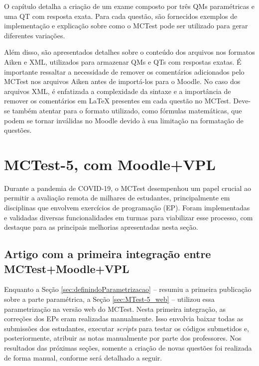 O capítulo detalha a criação de um exame composto por três QMs paramétricas e uma QT com resposta exata. Para cada questão, são fornecidos exemplos de implementação e explicação sobre como o MCTest pode ser utilizado para gerar diferentes variações.

Além disso, são apresentados detalhes sobre o conteúdo dos arquivos nos formatos Aiken e XML, utilizados para armazenar QMs e QTs com respostas exatas. É importante ressaltar a necessidade de remover os comentários adicionados pelo MCTest nos arquivos Aiken antes de importá-los para o Moodle. No caso dos arquivos XML, é enfatizada a complexidade da sintaxe e a importância de remover os comentários em \LaTeX{} presentes em cada questão no MCTest. Deve-se também atentar para o formato utilizado, como fórmulas matemáticas, que podem se tornar inválidas no Moodle devido à sua limitação na formatação de questões.

\section{MCTest-5, com Moodle+VPL}

Durante a pandemia de COVID-19, o MCTest desempenhou um papel crucial ao permitir a avaliação remota de milhares de estudantes, principalmente em disciplinas que envolvem exercícios de programação (EP). Foram implementadas e validadas diversas funcionalidades em turmas para viabilizar esse processo, com destaque para as principais melhorias apresentadas nesta seção. %

\subsection{Artigo com a primeira integração entre MCTest+Moodle+VPL}\label{sec:MCTest-5web}

Enquanto a Seção \ref{sec:definindoParametrizacao} --  resumiu a primeira publicação sobre a parte paramétrica, a Seção \ref{sec:MTest-5_web} --  utilizou essa parametrização na versão web do MCTest. Nesta primeira integração, as correções dos EPs eram realizadas manualmente. Isso envolvia baixar todas as submissões dos estudantes, executar \textit{scripts} para testar os códigos submetidos e, posteriormente, atribuir as notas manualmente por parte dos professores. Nos resultados das próximas seções, somente a criação de novas questões foi realizada de forma manual, conforme será detalhado a seguir.

